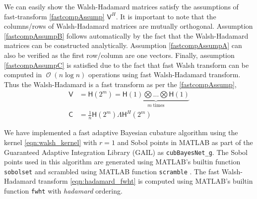 \documentclass{iitthesis}          %
\DeclareMathOperator{\Order}{{\mathcal O}}
\newcommand{\mC}{\mathsf{C}}
\newcommand{\mH}{\mathsf{H}}
\newcommand{\mLambda}{\mathsf{\Lambda}}
\newcommand{\mV}{\mathsf{V}}
\newcommand{\code}[1]{\texttt{#1}}
\newcommand{\JRNote}[1]{{\textcolor{green}{JR: #1}}}
\begin{document}
We can easily show the Walsh-Hadamard matrices satisfy the assumptions of fast-transform \eqref{fastcompAssump} $\mV^H$. It is important to note that the columns/rows of Walsh-Hadamard matrices are mutually orthogonal. Assumption \eqref{fastcompAssumpB} follows automatically by the fact that the Walsh-Hadamard matrices can be constructed analytically. Assumption \eqref{fastcompAssumpA} can also be verified as the first row/column are one vectors. Finally, assumption \eqref{fastcompAssumpC} is satisfied due to the fact that fast Walsh transform can be computed in $\Order({n \log n})$ operations using fast Walsh-Hadamard transform. Thus the Walsh-Hadamard is a fast transform as per the \eqref{fastcompAssump},
\begin{align}
\label{eqn:hadamard_fwht}
\mV &= \mH({2^m}) = \underbrace{ \mH(1) \bigotimes \ldots \bigotimes \mH(1) }_{m \; \text{times}} \\
\nonumber
\mC &= \frac{1}{n} \mH(2^m) \mLambda \mH^H(2^m)
\end{align}


We have implemented a fast adaptive Bayesian cubature algorithm using the kernel \eqref{eqn:walsh_kernel} with $r=1$ and Sobol points \cite{BraFox88} in MATLAB as part of the Guaranteed Adaptive Integration Library (GAIL) \cite{ChoEtal17b} as \allowbreak \code{cubBayesNet\_g}. The Sobol points used in this algorithm are generated using MATLAB's builtin function \code{sobolset} and scrambled using MATLAB function \code{scramble} \cite{HonHic00a}. The fast Walsh-Hadamard transform \eqref{eqn:hadamard_fwht} is computed using MATLAB's builtin function \code{fwht} with \emph{hadamard} ordering.
\end{document}
